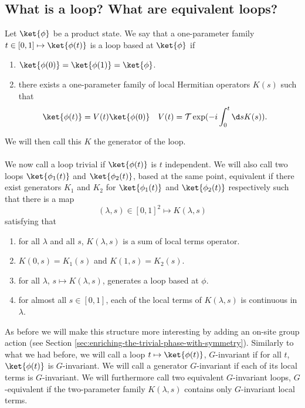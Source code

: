 \subsection{What is a loop? What are equivalent loops?}
Let $\ket{\phi}$ be a product state. We say that a one-parameter family $t\in[0,1]\mapsto \ket{\phi(t)}$ is a loop based at $\ket{\phi}$ if
\begin{enumerate}
	\item $\ket{\phi(0)}=\ket{\phi(1)}=\ket{\phi}$.
	\item there exists a one-parameter family of local Hermitian operators $K(s)$ such that
	\begin{align}
	\ket{\phi(t)}&=V(t)\ket{\phi(0)}&V(t)&=\mathcal{T}\exp(-i\int_{0}^{t}\d s K(s)).
	\end{align}
\end{enumerate}
We will then call this $K$ the generator of the loop.\\\\
We now call a loop trivial if $\ket{\phi(t)}$ is $t$ independent. We will also call two loops $\ket{\phi_1(t)}$ and $\ket{\phi_2(t)}$, based at the same point, equivalent if there exist generators $K_1$ and $K_2$ for $\ket{\phi_1(t)}$ and $\ket{\phi_2(t)}$ respectively such that there is a map
\begin{equation}
(\lambda,s)\in[0,1]^2\mapsto K(\lambda,s) 
\end{equation}
satisfying that
\begin{enumerate}
	\item for all $\lambda$ and all $s$, $K(\lambda,s)$ is a sum of local terms operator.
	\item $K(0,s)=K_1(s)$ and $K(1,s)=K_2(s)$.
	\item for all $\lambda$, $s\mapsto K(\lambda,s)$, generates a loop based at $\phi$.
	\item for almost all $s\in[0,1]$, each of the local terms of $K(\lambda,s)$ is continuous in $\lambda$.
\end{enumerate}
As before we will make this structure more interesting by adding an on-site group action (see Section \ref{sec:enriching-the-trivial-phase-with-symmetry}). Similarly to what we had before, we will call a loop $t\mapsto\ket{\phi(t)}$, $G$-invariant if for all $t$, $\ket{\phi(t)}$ is $G$-invariant. We will call a generator $G$-invariant if each of its local terms is $G$-invariant. We will furthermore call two equivalent $G$-invariant loops, $G$-equivalent if the two-parameter family $K(\lambda,s)$ contains only $G$-invariant local terms.\\\\
